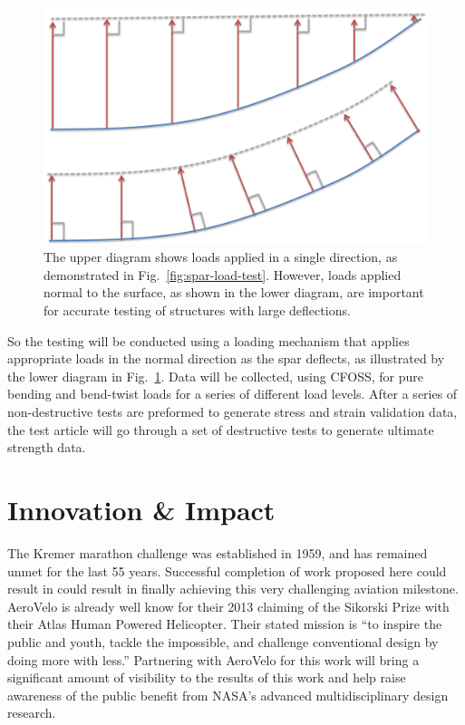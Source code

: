 \documentclass[]{aiaa-tc}
\begin{document}
        \begin{figure}[!htbp]
            \centering
            \includegraphics[width=.75\textwidth]{images/follower_force}
            \caption{The upper diagram shows loads applied in a single direction, as demonstrated in Fig.~\ref{fig:spar-load-test}. However, loads applied normal to the surface, as shown in the lower diagram, are important for accurate testing of structures with large deflections.}
            \label{fig:follower-force}
        \end{figure}

        So the testing will be conducted using a loading mechanism that applies appropriate loads in the normal direction
        as the spar deflects, as illustrated by the lower diagram in Fig.~\ref{fig:follower-force}. Data will be collected, using CFOSS, for pure bending and bend-twist loads for a series of different 
        load levels. After a series of non-destructive tests are preformed to generate stress and strain validation data, the test 
        article will go through a set of destructive tests to generate ultimate strength data. 


  \section{Innovation \& Impact}

    The Kremer marathon challenge was established in 1959, and has remained unmet for the last 55 years. 
    Successful completion of work proposed here could result in could result in finally achieving this very challenging
    aviation milestone. AeroVelo is already well know for their 2013 claiming of the Sikorski Prize with their Atlas 
    Human Powered Helicopter. Their stated mission is ``to inspire the public and youth, tackle the impossible, and 
    challenge conventional design by doing more with less.'' Partnering with AeroVelo for this work will bring a significant
    amount of visibility to the results of this work and help raise awareness of the public benefit from NASA's advanced 
    multidisciplinary design research. 
\end{document}
